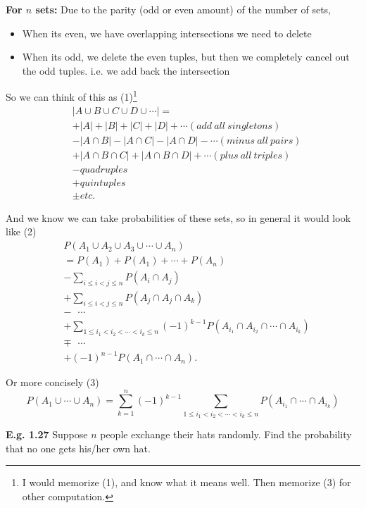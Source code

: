 \documentclass[12pt]{book}
\begin{document}
\noindent \textbf{For $n$ sets:}
Due to the parity (odd or even amount) of the number of sets, 
\begin{itemize}
\item When its even, we have overlapping intersections we need to delete
\item When its odd, we delete the even tuples, but then we completely cancel out the odd tuples. i.e. we add back the intersection
\end{itemize}
So we can think of this as (1)\footnote{I would memorize (1), and know what it means well. Then memorize (3) for other computation.}
\begin{align*}
&|A \cup B \cup C \cup D\cup \cdots| = \\
& +|A|+|B|+|C|+|D|+\cdots (add~all~singletons)\\
& -|A\cap B|-|A\cap C|-|A\cap D|-\cdots (minus~all~pairs)\\
& +|A\cap B \cap C |+|A\cap B \cap D|+\cdots (plus~all~triples)\\
& -quadruples\\
& +quintuples\\
& \pm etc.
\end{align*}

And we know we can take probabilities of these sets, so in general it would look like (2)
\begin{align*}
&P(A_{1}\cup A_{2} \cup A_{3} \cup \cdots \cup A_n)\\
&= P(A_{1}) + P(A_{1}) + \cdots +P(A_{n}) \\
& -\sum\limits_{i\leq i<j\leq n} P(A_{i}\cap A_j)\\
& + \sum\limits_{i\leq i<j\leq n} P(A_{j}\cap A_{j} \cap A_{k}) \\
&-~~~\cdots\\
&+ \sum\limits_{1\leq i_{1}<i_{2}<\cdots<i_{k}\leq n} (-1)^{k-1} P(A_{i_{1}}\cap A_{i_{2}} \cap \cdots \cap A_{i_{k}}) \\
& \mp~~~\cdots\\
& +(-1)^{n-1} P(A_{1} \cap \cdots \cap A_{n}).
\end{align*}


Or more concisely (3)\small
$$\boxed {P(A_{1} \cup \cdots \cup A_{n})=\sum\limits_{k=1}^{n} (-1)^{k-1} \sum\limits_{1\leq i_{1} <i_{2} < \cdots < i_{k} \leq n} P(A_{i_{1}} \cap \cdots \cap A_{i_{k}}) }$$
\normalsize

\noindent \textbf{E.g. 1.27} Suppose $n$ people exchange their hats randomly. Find the probability that no one gets his/her own hat.\\
\end{document}
